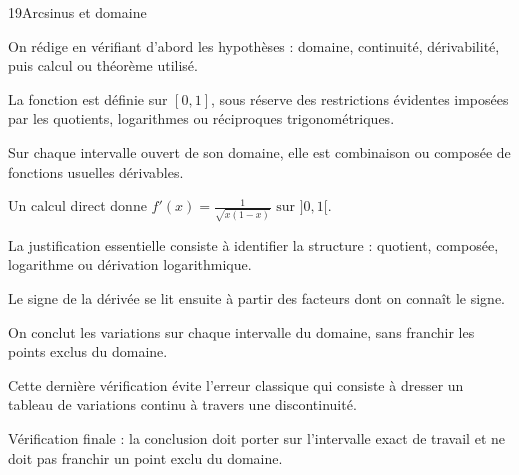 \documentclass[11pt,a4paper]{article}
\begin{document}
\begin{corrbox}{19}{Arcsinus et domaine}

\begin{methodebox}
On rédige en vérifiant d'abord les hypothèses : domaine, continuité, dérivabilité, puis calcul ou théorème utilisé.
\end{methodebox}

La fonction est définie sur $[0,1]$, sous réserve des restrictions évidentes imposées par les quotients, logarithmes ou réciproques trigonométriques.


Sur chaque intervalle ouvert de son domaine, elle est combinaison ou composée de fonctions usuelles dérivables.


Un calcul direct donne $f'(x)=\frac{1}{\sqrt{x(1-x)}}\text{ sur }]0,1[$.


La justification essentielle consiste à identifier la structure : quotient, composée, logarithme ou dérivation logarithmique.


Le signe de la dérivée se lit ensuite à partir des facteurs dont on connaît le signe.


On conclut les variations sur chaque intervalle du domaine, sans franchir les points exclus du domaine.


Cette dernière vérification évite l'erreur classique qui consiste à dresser un tableau de variations continu à travers une discontinuité.


\begin{attentionbox}
Vérification finale : la conclusion doit porter sur l'intervalle exact de travail et ne doit pas franchir un point exclu du domaine.
\end{attentionbox}

\end{corrbox}
\end{document}
